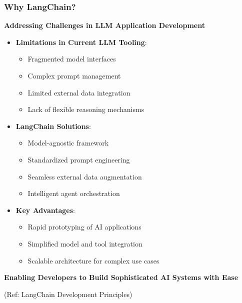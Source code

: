 \begin{frame}\frametitle{Why LangChain?}

\textbf{Addressing Challenges in LLM Application Development}

\begin{itemize}
\item \textbf{Limitations in Current LLM Tooling}:
    \begin{itemize}
        \item Fragmented model interfaces
        \item Complex prompt management
        \item Limited external data integration
        \item Lack of flexible reasoning mechanisms
    \end{itemize}

\item \textbf{LangChain Solutions}:
    \begin{itemize}
        \item Model-agnostic framework
        \item Standardized prompt engineering
        \item Seamless external data augmentation
        \item Intelligent agent orchestration
    \end{itemize}

\item \textbf{Key Advantages}:
    \begin{itemize}
        \item Rapid prototyping of AI applications
        \item Simplified model and tool integration
        \item Scalable architecture for complex use cases
    \end{itemize}
\end{itemize}

\begin{center}
\textbf{Enabling Developers to Build Sophisticated AI Systems with Ease}
\end{center}

{\tiny (Ref: LangChain Development Principles)}
\end{frame}

